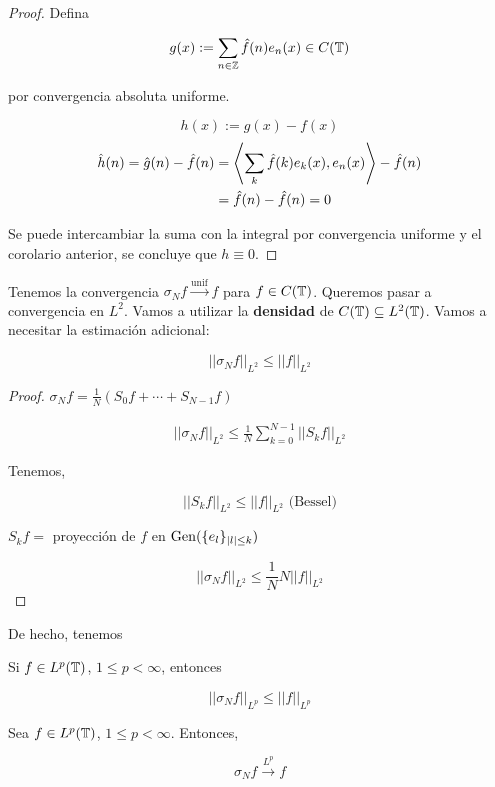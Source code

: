 \begin{proof}
    Defina 

    \[g(x):=\sum_{n\in\mathbb{Z}}\hat f(n)e_n(x)\in C(\mathbb{T})\]

    por convergencia absoluta uniforme.

    \[h(x):=g(x)-f(x)\]
    \begin{align*}
        \hat h(n)=\hat g(n)-\hat f(n)&=\left\langle \sum_{k} \hat f(k)e_k(x),e_n(x)\right\rangle-\hat f(n)\\
        &=\hat f(n)-\hat f(n)=0
    \end{align*}

    Se puede intercambiar la suma con la integral por convergencia uniforme y el corolario anterior, se concluye que $h\equiv 0$.
\end{proof}

Tenemos la convergencia $\sigma_N f\xrightarrow{\text{unif}} f$ para $f\in C(\mathbb{T})$. Queremos pasar a convergencia en $L^2$. Vamos a utilizar la \textbf{densidad} de $C(\mathbb{T})\subseteq L^2(\mathbb{T})$. Vamos a necesitar la estimación adicional:

\begin{fproposition}
    \[||\sigma_N f||_{L^2}\leq ||f||_{L^2}\]
\end{fproposition}

\begin{proof}
    $\sigma_N f=\frac{1}{N}(S_0 f+\cdots+S_{N-1} f)$

    \begin{align*}
        ||\sigma_N f||_{L^2} \leq \frac{1}{N} \sum_{k=0}^{N-1} ||S_k f||_{L^2}
    \end{align*}

    Tenemos,

    \[||S_k f||_{L^2}\leq ||f||_{L^2}\text{ (Bessel)}\]

    $S_k f=$ proyección de $f$ en $\operatorname{Gen}(\{e_l\}_{|l|\leq k})$

    \[||\sigma_N f||_{L^2}\leq \frac{1}{N}N||f||_{L^2}\]
\end{proof}

De hecho, tenemos 

\begin{fproposition}
    Si $f\in L^p(\mathbb{T})$, $1\leq p<\infty$, entonces 

    \[||\sigma_N f||_{L^p}\leq ||f||_{L^p}\]
\end{fproposition}

\begin{ftheorem}
    Sea $f\in L^p(\mathbb{T})$, $1\leq p<\infty$. Entonces,

    \[\sigma_N f\xrightarrow{L^p} f\]
\end{ftheorem}

